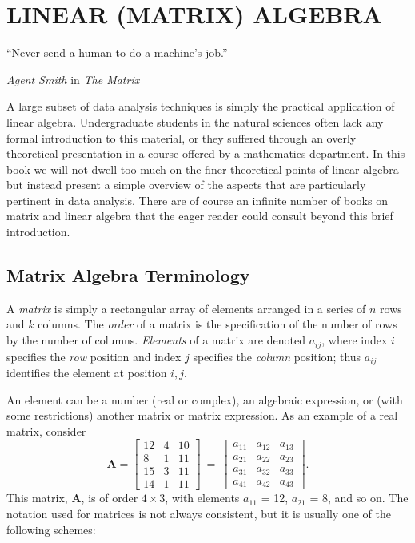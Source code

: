 %
\chapter{LINEAR (MATRIX) ALGEBRA}
\epigraph{``Never send a human to do a machine's job.''}{\textit{Agent Smith} in \textit{The Matrix}}
\label{ch:matrix}
A large subset of data analysis techniques is simply the practical application of
linear algebra.  Undergraduate students in the natural sciences often lack any formal introduction
to this material, or they suffered through an overly theoretical presentation in a course
offered by a mathematics department.  In this book we will not dwell too much on the finer
theoretical points of linear algebra but instead present a simple overview of the aspects that are particularly
pertinent in data analysis.  There are of course an infinite number of books on matrix and
linear algebra that the eager reader could consult beyond this brief introduction.

\section{Matrix Algebra Terminology}

	A \emph{matrix} is simply a rectangular array of elements arranged in a series of $n$ rows and $k$  
columns. The \emph{order} of a matrix is the specification of the number of rows by the number of 
columns. \emph{Elements} of a matrix are denoted $a_{ij}$, where index $i$ specifies the \emph{row} position 
and index $j$ specifies the \emph{column} position; thus $a_{ij}$ identifies the element at position $i,j$.

	An element can be a number (real or complex), an algebraic expression, or (with some 
restrictions) another matrix or matrix expression. As an example of a real matrix,  consider
\begin{equation}
\mathbf{A} = \left[ \begin{array}{rcc}
12 & 4 & 10 \\
8 & 1 & 11\\
15 & 3 & 11\\
14 & 1 & 11
\end{array}   \right]	 
 \ = \
\left[  \begin{array}{ccc}
a_{11} & a_{12} & a_{13} \\
a_{21} & a_{22} & a_{23}\\
a_{31} & a_{32} & a_{33} \\
a_{41} & a_{42} & a_{43}
\end{array} \right].
\end{equation}
This matrix, $\mathbf A$, is of order $4 \times 3$, with elements $a_{11}$ = 12, $a_{21}$ = 8, and so on. The notation used for matrices is 
not always consistent, but it is usually one of the following schemes:

